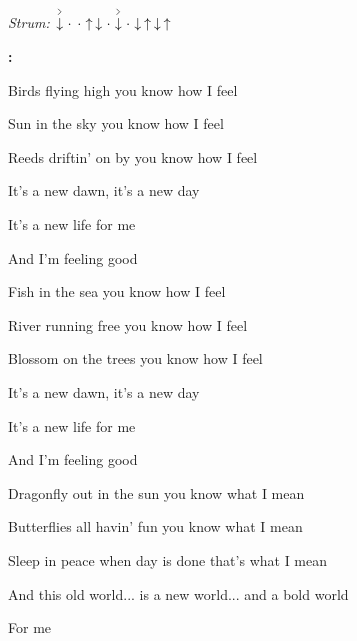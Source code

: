 \begin{song}


\begin{headerbox}
\RaiseBoxWithAccents
{} \quad
\textit{Strum:} $\AccentDown\Miss\Miss\Up\Down\Miss\AccentDown\Miss\Down\Up\Down\Up$
\end{headerbox}

\begin{hchordbox}
\end{hchordbox}

\Large

\bigskip

\Intro\textbf{:}     \par

\bigskip

 Birds flying high  you know how I feel \par
{} Sun in the sky  you know how I feel \par
{}Reeds driftin' on by  you know how I feel \par
It's a new dawn, it's a new day \par
It's a new life  for me  \par
And I'm feeling good    \par

\bigskip

 Fish in the sea  you know how I feel \par
{} River running free  you know how I feel \par
{} Blossom on the trees  you know how I feel \par
It's a new dawn, it's a new day \par
It's a new life  for me  \par
And I'm feeling good    \par

\bigskip

 Dragonfly out in the sun  you know what I mean \par %
{} Butterflies all havin' fun  you know what I mean \par
{} Sleep in peace when day is done  that's what I mean \par
And this old world... is a new world... and a bold world  \par
For me    \par


\end{song}
